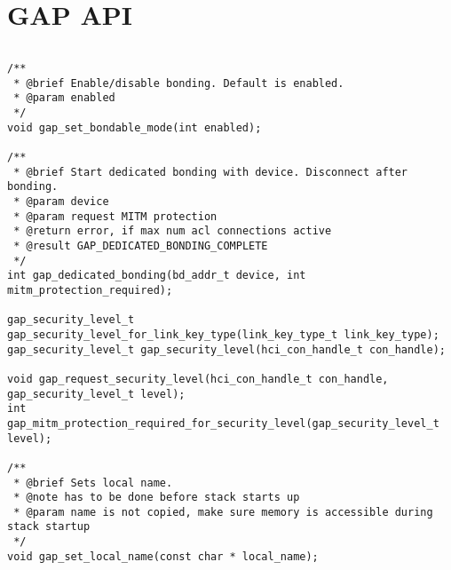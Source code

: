\section{GAP API}
\label{appendix:api_gap}
$ $
\begin{lstlisting}
/**
 * @brief Enable/disable bonding. Default is enabled.
 * @param enabled
 */
void gap_set_bondable_mode(int enabled);

/**
 * @brief Start dedicated bonding with device. Disconnect after bonding.
 * @param device
 * @param request MITM protection
 * @return error, if max num acl connections active
 * @result GAP_DEDICATED_BONDING_COMPLETE
 */
int gap_dedicated_bonding(bd_addr_t device, int mitm_protection_required);

gap_security_level_t gap_security_level_for_link_key_type(link_key_type_t link_key_type);
gap_security_level_t gap_security_level(hci_con_handle_t con_handle);

void gap_request_security_level(hci_con_handle_t con_handle, gap_security_level_t level);
int  gap_mitm_protection_required_for_security_level(gap_security_level_t level);

/** 
 * @brief Sets local name.
 * @note has to be done before stack starts up
 * @param name is not copied, make sure memory is accessible during stack startup
 */
void gap_set_local_name(const char * local_name);
\end{lstlisting}
\pagebreak
